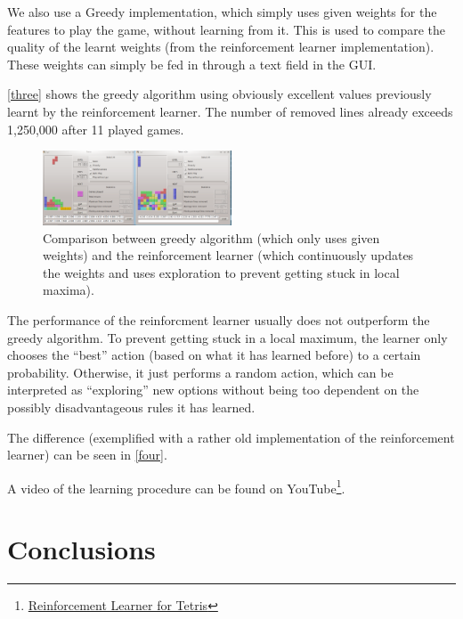 \documentclass{ml}
\begin{document}
We also use a Greedy implementation, which simply uses given weights for the features to play the game, without learning from it. 
This is used to compare the quality of the learnt weights (from the reinforcement learner implementation). 
These weights can simply be fed in through a text field in the GUI. 

\autoref{three} shows the greedy algorithm using obviously excellent values previously learnt by the reinforcement learner.
The number of removed lines already exceeds 1,250,000 after 11 played games. 

\begin{figure}
\vspace{-10pt}
  \begin{center}
    \includegraphics[width=0.5\textwidth]{img/four.png}
  \end{center}
  \vspace{-10pt}
  \caption{\small{Comparison between greedy algorithm (which only uses given weights) and the reinforcement learner (which continuously updates the weights and uses exploration to prevent getting stuck in local maxima).}}
  \label{four}
  \vspace{-10pt}
\end{figure}

The performance of the reinforcment learner usually does not outperform the greedy algorithm. 
To prevent getting stuck in a local maximum, the learner only chooses the ``best'' action (based on what it has learned before) to a certain probability. 
Otherwise, it just performs a random action, which can be interpreted as ``exploring'' new options without being too dependent on the possibly disadvantageous rules it has learned. 

The difference (exemplified with a rather old implementation of the reinforcement learner) can be seen in \autoref{four}.

A video of the learning procedure can be found on YouTube\footnote{\href{http://www.youtube.com/watch?v=eblep6rzEAU}{Reinforcement Learner for Tetris}}.


\section{Conclusions}
\label{conclusions}

\lipsum[1]


\newpage


\end{document}
